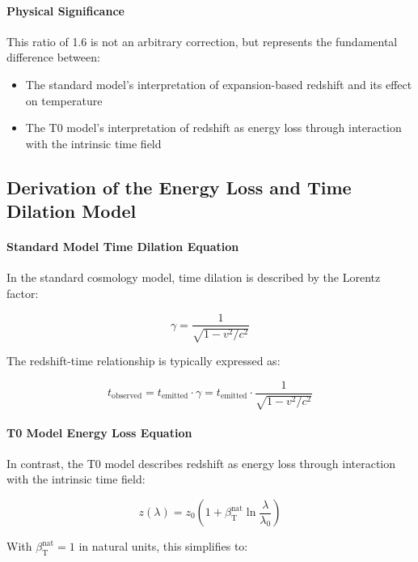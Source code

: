 \documentclass[12pt,a4paper]{article}
\newcommand{\betaT}{\beta_{\text{T}}}
\begin{document}
	\paragraph{Physical Significance}
	This ratio of 1.6 is not an arbitrary correction, but represents the fundamental difference between:
	\begin{itemize}
		\item The standard model's interpretation of expansion-based redshift and its effect on temperature
		\item The T0 model's interpretation of redshift as energy loss through interaction with the intrinsic time field
	\end{itemize}
	
	\subsection{Derivation of the Energy Loss and Time Dilation Model}
	\label{subsec:energy_loss_time_dilation_derivation}
	
	\paragraph{Standard Model Time Dilation Equation}
	In the standard cosmology model, time dilation is described by the Lorentz factor:
	
	\begin{equation}
		\gamma = \frac{1}{\sqrt{1 - v^2/c^2}}
	\end{equation}
	
	The redshift-time relationship is typically expressed as:
	
	\begin{equation}
		t_{\text{observed}} = t_{\text{emitted}} \cdot \gamma = t_{\text{emitted}} \cdot \frac{1}{\sqrt{1 - v^2/c^2}}
	\end{equation}
	
	\paragraph{T0 Model Energy Loss Equation}
	In contrast, the T0 model describes redshift as energy loss through interaction with the intrinsic time field:
	
	\begin{equation}
		z(\lambda) = z_0 \left(1 + \betaT^{\text{nat}} \ln\frac{\lambda}{\lambda_0}\right)
	\end{equation}
	
	With \(\betaT^{\text{nat}} = 1\) in natural units, this simplifies to:
	
\end{document}
